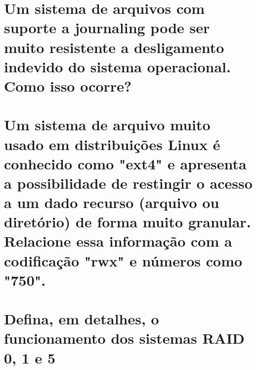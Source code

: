 \documentclass[11pt]{article}
\begin{document}
\section{Um sistema de arquivos com suporte a journaling pode ser muito resistente a desligamento indevido do sistema operacional. Como isso ocorre?}
\begin{linenumbers}
\resetlinenumber
\noindent\makebox[\linewidth]{\rule{\textwidth}{0.5pt}}
\noindent\makebox[\linewidth]{\rule{\textwidth}{0.5pt}}
\noindent\makebox[\linewidth]{\rule{\textwidth}{0.5pt}}
\noindent\makebox[\linewidth]{\rule{\textwidth}{0.5pt}}
\noindent\makebox[\linewidth]{\rule{\textwidth}{0.5pt}}
\end{linenumbers}

\section{Um sistema de arquivo muito usado em distribuições Linux é conhecido como "ext4" e apresenta a possibilidade de restingir o acesso a um dado recurso (arquivo ou diretório) de forma muito granular. Relacione essa informação com a codificação "rwx" e números como "750".}
\begin{linenumbers}
\resetlinenumber
\noindent\makebox[\linewidth]{\rule{\textwidth}{0.5pt}}
\noindent\makebox[\linewidth]{\rule{\textwidth}{0.5pt}}
\noindent\makebox[\linewidth]{\rule{\textwidth}{0.5pt}}
\noindent\makebox[\linewidth]{\rule{\textwidth}{0.5pt}}
\noindent\makebox[\linewidth]{\rule{\textwidth}{0.5pt}}
\noindent\makebox[\linewidth]{\rule{\textwidth}{0.5pt}}
\noindent\makebox[\linewidth]{\rule{\textwidth}{0.5pt}}
\noindent\makebox[\linewidth]{\rule{\textwidth}{0.5pt}}
\noindent\makebox[\linewidth]{\rule{\textwidth}{0.5pt}}
\noindent\makebox[\linewidth]{\rule{\textwidth}{0.5pt}}
\end{linenumbers}

\section{Defina, em detalhes, o funcionamento dos sistemas RAID 0, 1 e 5}
\begin{linenumbers}
\resetlinenumber
\noindent\makebox[\linewidth]{\rule{\textwidth}{0.5pt}}
\noindent\makebox[\linewidth]{\rule{\textwidth}{0.5pt}}
\noindent\makebox[\linewidth]{\rule{\textwidth}{0.5pt}}
\noindent\makebox[\linewidth]{\rule{\textwidth}{0.5pt}}
\noindent\makebox[\linewidth]{\rule{\textwidth}{0.5pt}}
\noindent\makebox[\linewidth]{\rule{\textwidth}{0.5pt}}
\noindent\makebox[\linewidth]{\rule{\textwidth}{0.5pt}}
\noindent\makebox[\linewidth]{\rule{\textwidth}{0.5pt}}
\noindent\makebox[\linewidth]{\rule{\textwidth}{0.5pt}}
\noindent\makebox[\linewidth]{\rule{\textwidth}{0.5pt}}
\end{linenumbers}

\end{document}
